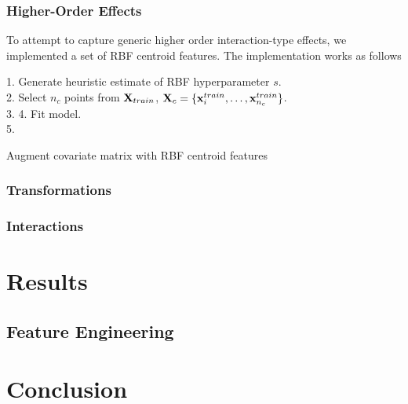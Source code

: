 \subsubsection{Higher-Order Effects}
To attempt to capture generic higher order interaction-type effects, we implemented a set of RBF centroid features. The implementation works as follows 
\begin{algorithm}[H]
    1. Generate heuristic estimate of RBF hyperparameter $s$.\\
    2. Select $n_c$ points from $\mathbf{X}_{train}$, $\mathbf{X}_c = \{\mathbf{x}^{train}_i, \dots, \mathbf{x}^{train}_{n_c}\}$.\\
    3.  
    4. Fit model.\\
    5. 
    \caption{Augment covariate matrix with RBF centroid features}
\end{algorithm}

\subsubsection{Transformations}

\subsubsection{Interactions}

\section{Results}
\subsection{Feature Engineering}



\section{Conclusion}

\pagebreak 


{}


